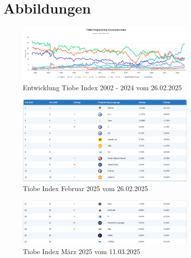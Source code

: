 \documentclass[11pt]{article}
\begin{document}
    \printbibliography[
        heading=bibintoc,
        title={Literaturverzeichnis}
    ]
    \appendix
    \section{Abbildungen}

    \begin{figure}[h]
        \centering
        \includegraphics[width=0.8\textwidth]{pictures/Screenshot 2025-02-26 at 19-53-49 TIOBE Index - TIOBE}
        \caption{Entwicklung Tiobe Index 2002 - 2024 vom 26.02.2025 }
        \label{fig:entwicklung-tiobe}
    \end{figure}

    \begin{figure}[h]
        \centering
        \includegraphics[width=0.8\textwidth]{pictures/Screenshot 2025-02-26 at 19-54-42 TIOBE Index - TIOBE}
        \caption{Tiobe Index Februar 2025 vom 26.02.2025}
        \label{fig:tiobe-java-2025}
    \end{figure}

    \begin{figure}[h]
        \centering
        \includegraphics[width=0.8\textwidth]{pictures/Screenshot 2025-03-11 at 22-21-04 TIOBE Index - TIOBE}
        \caption{Tiobe Index März 2025 vom 11.03.2025}
        \label{fig:tiobe-kotlin-2025}
    \end{figure}
\end{document}

